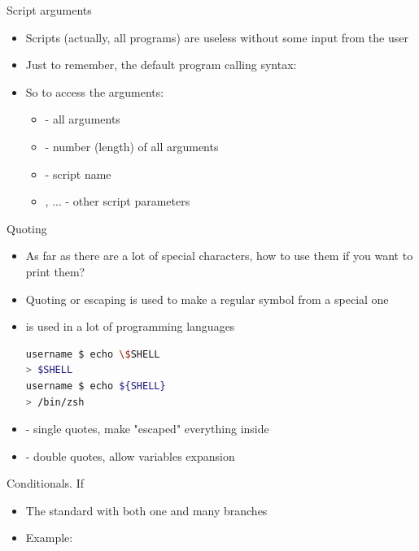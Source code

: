 \documentclass[usenames,dvipsnames,10pt,aspectratio=169]{beamer}
\begin{document}
\begin{frame}{Script arguments}
    \begin{itemize}
        \item Scripts (actually, all programs) are useless without some input from the user
        \item Just to remember, the default program calling syntax:
        \begin{examples}
        \end{examples}
        \item So to access the arguments:
        \begin{itemize}
            \item {} - all arguments
            \item \ex{\$\{\#\}} - number (length) of all arguments
            \item {} - script name
            \item {}, ... - other script parameters
        \end{itemize}
    \end{itemize}
\end{frame}

\begin{frame}[fragile]{Quoting}
    \begin{itemize}
        \item As far as there are a lot of special characters, how to use them if you want to print them?
        \item Quoting or escaping is used to make a regular symbol from a special one
        \item \ex{\textbackslash} is used in a lot of programming languages
        \begin{lstlisting}[language=Bash, style=shellstyle]
username $ echo \$SHELL
> $SHELL
username $ echo ${SHELL}
> /bin/zsh \end{lstlisting}
        \item {} - single quotes, make "escaped" everything inside
        \item {} - double quotes, allow variables expansion
    \end{itemize}
\end{frame}

\begin{frame}{Conditionals. If}
    \begin{itemize}
        \item The standard  with both one and many branches
        
        \item Example:
        
    \end{itemize}
\end{frame}
\end{document}
